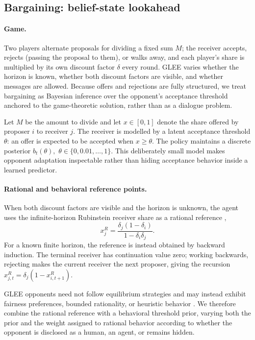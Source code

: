 \documentclass{article}
\begin{document}
\subsection{Bargaining: belief-state lookahead}

\paragraph{Game.}
Two players alternate proposals for dividing a fixed sum $M$; the receiver accepts, rejects (passing the proposal to them), or walks away, and each player's share is multiplied by its own discount factor $\delta$ every round.
GLEE varies whether the horizon is known, whether both discount factors are visible, and whether messages are allowed.
Because offers and rejections are fully structured, we treat bargaining as Bayesian inference over the opponent's acceptance threshold anchored to the game-theoretic solution, rather than as a dialogue problem.

Let $M$ be the amount to divide and let $x\in[0,1]$ denote the share offered by proposer $i$ to receiver $j$.
The receiver is modelled by a latent acceptance threshold $\theta$: an offer is expected to be accepted when $x\geq\theta$.
The policy maintains a discrete posterior
\(
    b_t(\theta), \,\,
    \theta\in\{0,0.01,\ldots,1\}.
\)
This deliberately small model makes opponent adaptation inspectable rather than hiding acceptance behavior inside a learned predictor.

\paragraph{Rational and behavioral reference points.}

When both discount factors are visible and the horizon is unknown, the agent uses the infinite-horizon Rubinstein receiver share as a rational reference \citep{rubinstein1982perfect},
\[
    x^R_j
    =
    \frac{\delta_j(1-\delta_i)}
         {1-\delta_i\delta_j}.
    \label{eq:rubinstein}
\]
For a known finite horizon, the reference is instead obtained by backward induction.
The terminal receiver has continuation value zero; working backwards, rejecting makes the current receiver the next proposer, giving the recursion
\(
    x^R_{j,t}
      =
      \delta_j\left(1-x^R_{i,t+1}\right).
\)

GLEE opponents need not follow equilibrium strategies and may instead exhibit fairness preferences, bounded rationality, or heuristic behavior \citep{fehr1999theory}.
We therefore combine the rational reference with a behavioral threshold prior, varying both the prior and the weight assigned to rational behavior according to whether the opponent is disclosed as a human, an agent, or remains hidden.
\end{document}
